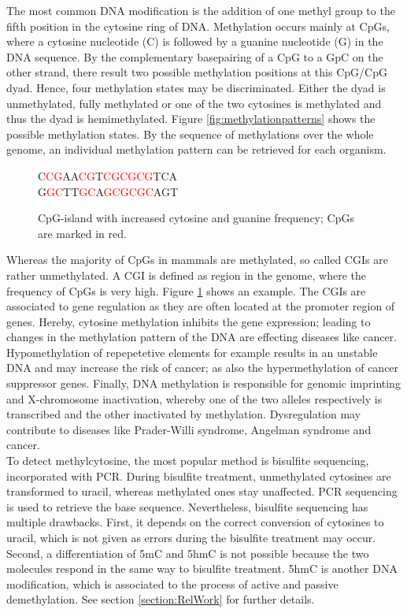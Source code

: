 The most common DNA modification is the addition of one methyl group to the fifth position in the cytosine ring of DNA. Methylation occurs mainly at \acfp{CpG}, where a cytosine nucleotide (C) is followed by a guanine nucleotide (G) in the DNA sequence. By the complementary basepairing of a \ac{CpG} to a \ac{GpC} on the other strand, there result two possible methylation positions at this CpG/CpG dyad. Hence, four methylation states may be discriminated. Either the dyad is unmethylated, fully methylated or one of the two cytosines is methylated and thus the dyad is hemimethylated. Figure \ref{fig:methylationpatterns} shows the possible methylation states. By the sequence of methylations over the whole genome, an individual methylation pattern can be retrieved for each organism\cite{DNAMethylation}.\\

\begin{figure}[h]
\centering
C\textcolor{red}{CG}AA\textcolor{red}{CG}T\textcolor{red}{CGCGCG}TCA\\
G\textcolor{red}{GC}TT\textcolor{red}{GC}A\textcolor{red}{GCGCGC}AGT
\label{CGI}
\caption{CpG-island with increased cytosine and guanine frequency; CpGs are marked in red.}
\end{figure}

Whereas the majority of \acp{CpG} in mammals are methylated, so called \acfp{CGI} are rather unmethylated. A \ac{CGI} is defined as region in the genome, where the frequency of \acp{CpG} is very high. Figure \ref{CGI} shows an example. The \acp{CGI} are associated to gene regulation as they are often located at the promoter region of genes. Hereby, cytosine methylation inhibits the gene expression; leading to changes in the methylation pattern of the DNA are effecting diseases like cancer\cite{Handbook}. Hypomethylation of repepetetive elements for example results in an unstable DNA and may increase the risk of cancer; as also the hypermethylation of cancer suppressor genes.\cite{DNAMethylation} Finally, DNA methylation is responsible for genomic imprinting and X-chromosome inactivation, whereby one of the two alleles respectively is transcribed and the other inactivated by methylation. Dysregulation may contribute to diseases like Prader-Willi syndrome, Angelman syndrome and cancer\cite{Walter}.\\

To detect methylcytosine, the most popular method is bisulfite sequencing, incorporated with \ac{PCR}. During bisulfite treatment, unmethylated cytosines are transformed to uracil, whereas methylated ones stay unaffected. \ac{PCR} sequencing is used to retrieve the base sequence\cite{Bisseq}. Nevertheless, bisulfite sequencing has multiple drawbacks. First, it depends on the correct conversion of cytosines to uracil, which is not given as errors during the bisulfite treatment may occur. Second, a differentiation  of \acf{5mC} and \ac{5hmC} is not possible because the two molecules respond in the same way to bisulfite treatment\cite{5hmC}. \ac{5hmC} is another DNA modification, which is associated to the process of active and passive demethylation\cite{demethyl}\cite{Giehr}. See section \ref{section:RelWork} for further details.\\

